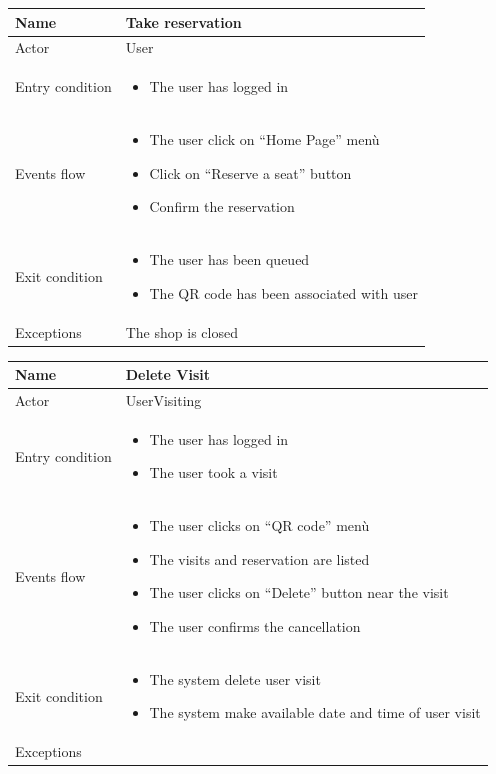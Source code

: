 \par \medskip

\begin{tabular}{|p{5cm} | p{7cm} | }
	\hline
	Name & Take reservation \\
	\hline
	Actor & User \\
	\hline
	Entry condition &
	\begin{itemize}
		\item The user has logged in 
	\end{itemize} \\
	\hline
	Events flow & 
	\begin{itemize}
		\item The user click on “Home Page” menù
		\item Click on “Reserve a seat” button
		\item Confirm the reservation
	\end{itemize} \\
	\hline
	Exit condition &
	\begin{itemize}	
		\item The user has been queued
		\item The QR code has been associated with user 
	\end{itemize} \\
	\hline 
	Exceptions & The shop is closed \\
	\hline
\end{tabular}

\par \medskip

\begin{tabular}{|p{5cm} | p{7cm} | }
	\hline
	Name & Delete Visit \\
	\hline
	Actor & UserVisiting \\
	\hline
	Entry condition &
	\begin{itemize}
		\item The user has logged in
		\item The user took a visit
	\end{itemize} \\
	\hline
	Events flow & 
	\begin{itemize}
		\item The user clicks on “QR code” menù
		\item The visits and reservation are listed
		\item The user clicks on “Delete” button near the visit
		\item The user confirms the cancellation
	\end{itemize} \\
	\hline
	Exit condition &
	\begin{itemize}	
		\item The system delete user visit
		\item The system make available date and time of user visit
	\end{itemize} \\
	\hline 
	Exceptions & \\
	\hline
\end{tabular}

